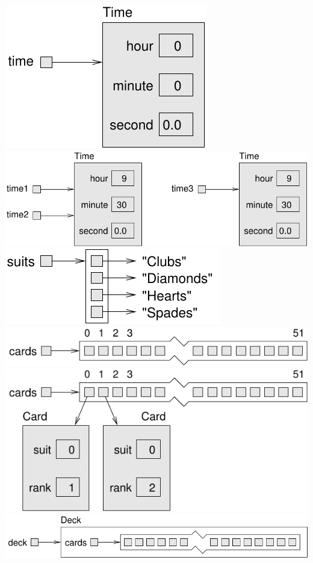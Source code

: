 \documentclass[12pt]{book}
\begin{document}
\clearpage%
\includegraphics{./figs/time.pdf}
\clearpage%
\includegraphics{./figs/time2.pdf}
\clearpage%
\includegraphics{./figs/stringarray.pdf}
\clearpage%
\includegraphics{./figs/cardarray.pdf}
\clearpage%
\includegraphics{./figs/cardarray2.pdf}
\clearpage%
\includegraphics{./figs/deckobject.pdf}
\end{document}

